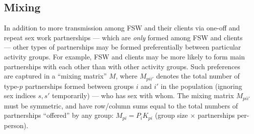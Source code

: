 \subsection{Mixing}\label{mod.par.mix}
In addition to more transmission among FSW and their clients
via one-off and repeat sex work partnerships
--- which are \emph{only} formed among FSW and clients ---
other types of partnerships may be formed
preferentially between particular activity groups.
For example, FSW and clients may be more likely to form main partnerships
with each other than with other activity groups.
Such preferences are captured in a ``mixing matrix'' $M$, where $M_{pii'}$ denotes
the total number of type-$p$ partnerships formed between groups $i$ and $i'$ in the population
(ignoring sex indices $s,s'$ temporarily)
--- \ie who has sex with whom.
The mixing matrix $M_{pii'}$ must be symmetric,
and have row/column sums equal to the total numbers of partnerships ``offered'' by any group:
$M_{pi} = P_{i} K_{pi}$ (group size $\times$ partnerships per-person).
